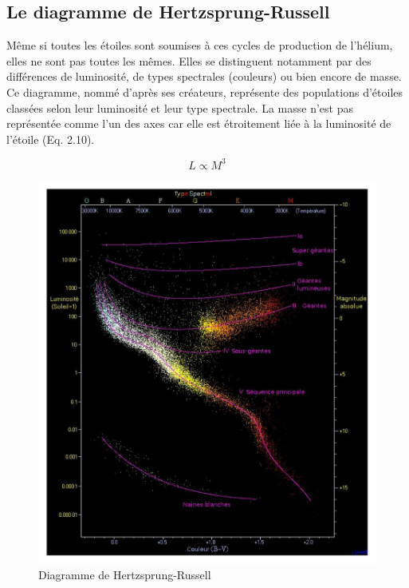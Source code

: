 \subsection{Le diagramme de Hertzsprung-Russell}\medskip

Même si toutes les étoiles sont soumises à ces cycles de production de l’hélium, elles ne sont pas toutes les mêmes. Elles se distinguent notamment par des différences de luminosité, de types spectrales (couleurs) ou bien encore de masse. Ce diagramme, nommé d’après ses créateurs, représente des populations d’étoiles classées selon leur luminosité et leur type spectrale. La masse n’est pas représentée comme l’un des axes car elle est étroitement liée à la luminosité de l’étoile (Eq. 2.10).

\begin{center}
\begin{equation}L \propto M^{3}\end{equation}
\end{center}\bigskip

\begin{figure}[H]\vspace{1cm}
	\centering
	\includegraphics[scale=0.4]{images/hr-diagram}
	\caption{Diagramme de Hertzsprung-Russell}
\end{figure}\bigskip

